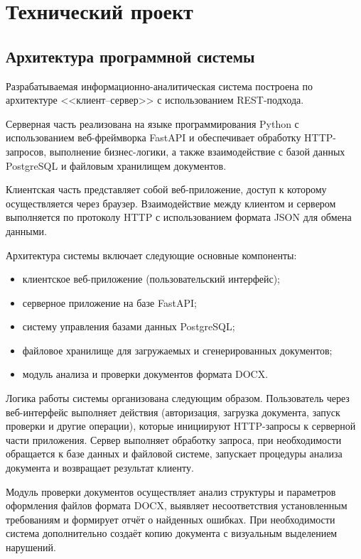\section{Технический проект}

\subsection{Архитектура программной системы}

Разрабатываемая информационно-аналитическая система построена по архитектуре <<клиент--сервер>> с использованием REST-подхода.

Серверная часть реализована на языке программирования Python с использованием веб-фреймворка FastAPI и обеспечивает обработку HTTP-запросов, выполнение бизнес-логики, а также взаимодействие с базой данных PostgreSQL и файловым хранилищем документов.

Клиентская часть представляет собой веб-приложение, доступ к которому осуществляется через браузер. Взаимодействие между клиентом и сервером выполняется по протоколу HTTP с использованием формата JSON для обмена данными.

Архитектура системы включает следующие основные компоненты:
\begin{itemize}
	\item клиентское веб-приложение (пользовательский интерфейс);
	
	\item серверное приложение на базе FastAPI;
	
	\item систему управления базами данных PostgreSQL;
	
	\item файловое хранилище для загружаемых и сгенерированных документов;
	
	\item модуль анализа и проверки документов формата DOCX.
\end{itemize}

Логика работы системы организована следующим образом. Пользователь через веб-интерфейс выполняет действия (авторизация, загрузка документа, запуск проверки и другие операции), которые инициируют HTTP-запросы к серверной части приложения. Сервер выполняет обработку запроса, при необходимости обращается к базе данных и файловой системе, запускает процедуры анализа документа и возвращает результат клиенту.

Модуль проверки документов осуществляет анализ структуры и параметров оформления файлов формата DOCX, выявляет несоответствия установленным требованиям и формирует отчёт о найденных ошибках. При необходимости система дополнительно создаёт копию документа с визуальным выделением нарушений.

